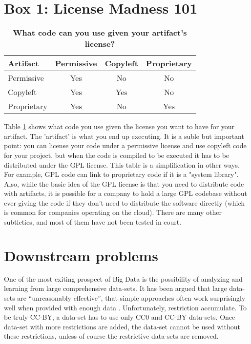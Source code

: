 \documentclass[letterpaper]{article}
\begin{document}
\section{Box 1: License Madness 101}

\begin{table}
  \centering
  \caption{\bf{What code can you use given your artifact's license?}}
  \begin{tabular}{|l|ccc|}
  \hline
  Artifact              & Permissive & Copyleft & Proprietary \\
  \hline
  Permissive            & Yes        & No       & No          \\
  Copyleft              & Yes        & Yes      & No          \\
  Proprietary           & Yes        & No       & Yes         \\
  \hline
  \end{tabular}
  \label{table:codelicenses}
\end{table}

Table \ref{table:codelicenses} shows what code you use given the license you
want to have for your artifact. The 'artifact' is what you end up executing.
It is a suble but important point: you can license your code under a permissive
license and use copyleft code for your project, but when the code is compiled
to be executed it has to be distributed under the GPL license. This table is a
simplification in other ways. For example, GPL code can link to proprietary
code if it is a "system library". Also, while the basic idea of the GPL license is
that you need to distribute code with artifacts, it is possible for a company
to hold a large GPL codebase without ever giving the code if they don't need to
distribute the software directly (which is common for companies operating on
the cloud). There are many other subtleties, and most of them have not been
tested in court.

\section{Downstream problems}

One of the most exiting prospect of Big Data is the possibility of analyzing
and learning from large comprehensive data-sets. It has been argued that
large data-sets are ``unreasonably effective'', that simple approaches often
work surprisingly well when provided with enough data \cite{hal09}. Unfortunately,
restriction accumulate. To be truly CC-BY, a data-set has to use only CC0 and
CC-BY data-sets. Once data-set with more restrictions are added, the data-set
cannot be used without these restrictions, unless of course the restrictive
data-sets are removed.
\end{document}

